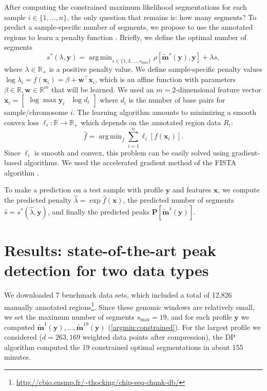 \documentclass{article}
\DeclareMathOperator*{\argmin}{arg\,min}
\newcommand{\RR}{\mathbb R}
\begin{document}
After computing the constrained maximum likelihood segmentations for
each sample $i\in\{1,\dots, n\}$, the only question that remains is:
how many segments? To predict a sample-specific number of segments, we
propose to use the annotated regions to learn a penalty function
\citep{HOCKING-penalties}. Briefly, we define the optimal number of
segments 
\begin{equation}
  s^*(\lambda, \mathbf y) = 
  \argmin_{s\in\{1,3,\dots, s_{\text{max}}\}}
  \rho\left[
    \mathbf{\tilde m}^s(\mathbf y),
    \mathbf y
  \right]
  + \lambda s,
\end{equation}
where $\lambda\in\RR_+$ is a positive
penalty value. We define sample-specific penalty values $\log
\lambda_i = f(\mathbf x_i) = \beta + \mathbf w^\intercal \mathbf x_i$,
which is an affine function with parameters $\beta\in\RR,\mathbf
w\in\RR^m$ that will be learned. We used an $m=2$-dimensional feature vector
$\mathbf x_i = \left[\begin{array}{cc} \log\max \mathbf y_i & \log d_i
\end{array}\right]$ where $d_i$ is the number of base pairs for 
sample/chromosome $i$. The learning algorithm amounts to minimizing a
smooth convex loss $\ell_i:\RR\rightarrow\RR_+$ which depends on the
annotated region data $R_i$:
\begin{equation}
  \label{eq:relax}
  \hat f = \argmin_f \sum_{i=1}^n
  \ell_i\left[ f(\mathbf x_i) \right].
\end{equation}
Since $\ell_i$ is smooth and convex, this problem can be easily solved
using gradient-based algorithms. We used the accelerated gradient
method of the FISTA algorithm \citep{fista}.

To make a prediction on a
test sample with profile $\mathbf y$ and features $\mathbf x$, we
compute the predicted penalty $\hat \lambda = \exp \hat f(\mathbf x)$,
the predicted number of segments $\hat s = s^*(\hat \lambda, \mathbf
y)$, and finally the predicted peaks $\mathbf P\left[ \mathbf{\tilde
    m}^{\hat s}(\mathbf y) \right]$.

\section{Results: state-of-the-art peak detection for two data types}

We downloaded 7 benchmark data sets, which included a
total of 12,826 manually annotated regions\footnote{\url{http://cbio.ensmp.fr/~thocking/chip-seq-chunk-db/}}.
Since these genomic windows are relatively small, we set the maximum
number of segments $s_{\text{max}}=19$, and for each profile $\mathbf
y$ we computed $\mathbf{\tilde m}^1(\mathbf y), \dots, \mathbf{\tilde
  m}^{19}(\mathbf y)$ (\ref{argmin:constrained}). For the largest
profile we considered ($d=263,169$ weighted data points after
compression), the DP algorithm computed the 19 constrained optimal
segmentations in about 155 minutes.
\end{document}

